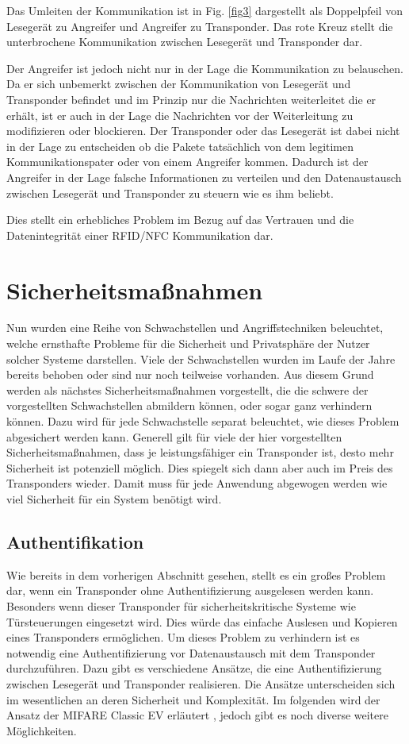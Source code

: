 \documentclass[conference]{IEEEtran}
\begin{document}
Das Umleiten der Kommunikation ist in Fig. \ref{fig3} dargestellt als Doppelpfeil von Lesegerät zu Angreifer und Angreifer zu Transponder. Das rote Kreuz stellt die unterbrochene Kommunikation zwischen Lesegerät und Transponder dar.

Der Angreifer ist jedoch nicht nur in der Lage die Kommunikation zu belauschen. Da er sich unbemerkt zwischen der Kommunikation von Lesegerät und Transponder befindet und im Prinzip nur die Nachrichten weiterleitet die er erhält, ist er auch in der Lage die Nachrichten vor der Weiterleitung zu modifizieren oder blockieren. Der Transponder oder das Lesegerät ist dabei nicht in der Lage zu entscheiden ob die Pakete tatsächlich von dem legitimen Kommunikationspater oder von einem Angreifer kommen. Dadurch ist der Angreifer in der Lage falsche Informationen zu verteilen und den Datenaustausch zwischen Lesegerät und Transponder zu steuern wie es ihm beliebt.

Dies stellt ein erhebliches Problem im Bezug auf das Vertrauen und die Datenintegrität einer RFID/NFC Kommunikation dar.

\section{Sicherheitsmaßnahmen}
Nun wurden eine Reihe von Schwachstellen und Angriffstechniken beleuchtet, welche ernsthafte Probleme für die Sicherheit und Privatsphäre der Nutzer solcher Systeme darstellen. Viele der Schwachstellen wurden im Laufe der Jahre bereits behoben oder sind nur noch teilweise vorhanden. Aus diesem Grund werden als nächstes Sicherheitsmaßnahmen vorgestellt, die die schwere der vorgestellten Schwachstellen abmildern können, oder sogar ganz verhindern können. Dazu wird für jede Schwachstelle separat beleuchtet, wie dieses Problem abgesichert werden kann. Generell gilt für viele der hier vorgestellten Sicherheitsmaßnahmen, dass je leistungsfähiger ein Transponder ist, desto mehr Sicherheit ist potenziell möglich. Dies spiegelt sich dann aber auch im Preis des Transponders wieder. Damit muss für jede Anwendung abgewogen werden wie viel Sicherheit für ein System benötigt wird.

\subsection{Authentifikation}
Wie bereits in dem vorherigen Abschnitt gesehen, stellt es ein großes Problem dar, wenn ein Transponder ohne Authentifizierung ausgelesen werden kann. Besonders wenn dieser Transponder für sicherheitskritische Systeme wie Türsteuerungen eingesetzt wird. Dies würde das einfache Auslesen und Kopieren eines Transponders ermöglichen. Um dieses Problem zu verhindern ist es notwendig eine Authentifizierung vor Datenaustausch mit dem Transponder durchzuführen. Dazu gibt es verschiedene Ansätze, die eine Authentifizierung zwischen Lesegerät und Transponder realisieren. Die Ansätze unterscheiden sich im wesentlichen an deren Sicherheit und Komplexität. Im folgenden wird der Ansatz der MIFARE Classic EV erläutert \cite{b4}, jedoch gibt es noch diverse  weitere Möglichkeiten.
\end{document}
